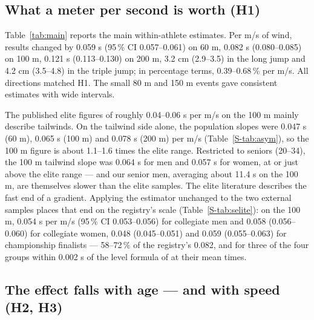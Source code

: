 \documentclass[12pt,a4paper]{article}
\begin{document}
\subsection{What a meter per second is worth (H1)}

Table~\ref{tab:main} reports the main within-athlete estimates. Per m/s of wind, results changed by 0.059 s (95\,\% CI 0.057--0.061) on 60 m, 0.082 s (0.080--0.085) on 100 m, 0.121 s (0.113--0.130) on 200 m, 3.2 cm (2.9--3.5) in the long jump and 4.2 cm (3.5--4.8) in the triple jump; in percentage terms, 0.39--0.68\,\% per m/s. All directions matched H1. The small 80 m and 150 m events gave consistent estimates with wide intervals.

The published elite figures of roughly 0.04--0.06 s per m/s on the 100 m \citep{linthorne1994,moinat2018} mainly describe tailwinds. On the tailwind side alone, the population slopes were 0.047 s (60 m), 0.065 s (100 m) and 0.078 s (200 m) per m/s (Table~\ref{S-tab:asym}), so the 100 m figure is about 1.1--1.6 times the elite range. Restricted to seniors (20--34), the 100 m tailwind slope was 0.064 s for men and 0.057 s for women, at or just above the elite range --- and our senior men, averaging about 11.4 s on the 100 m, are themselves slower than the elite samples. The elite literature describes the fast end of a gradient. Applying the estimator unchanged to the two external samples places that end on the registry's scale (Table~\ref{S-tab:selite}): on the 100 m, 0.054 s per m/s (95\,\% CI 0.053--0.056) for collegiate men and 0.058 (0.056--0.060) for collegiate women, 0.048 (0.045--0.051) and 0.059 (0.055--0.063) for championship finalists --- 58--72\,\% of the registry's 0.082, and for three of the four groups within 0.002 s of the level formula of \citet{moinat2018} at their mean times.

\subsection{The effect falls with age --- and with speed (H2, H3)}
\end{document}
